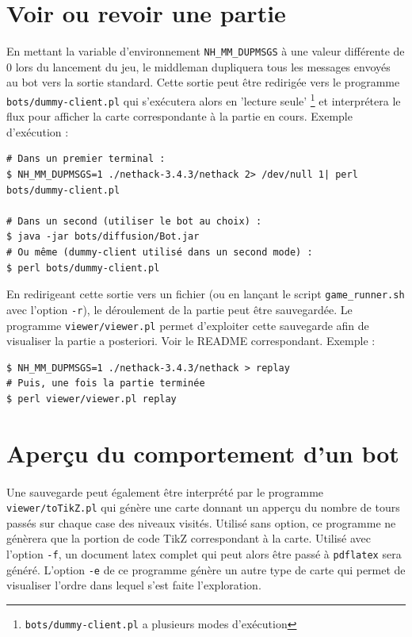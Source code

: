 \documentclass[10pt,a4paper]{report}
\begin{document}
\section{Voir ou revoir une partie}

En mettant la variable d'environnement \verb!NH_MM_DUPMSGS! à une valeur
différente de 0 lors du lancement du jeu, le middleman dupliquera tous les
messages envoyés au bot vers la sortie standard. Cette sortie peut être
redirigée vers le programme \verb!bots/dummy-client.pl! qui s'exécutera alors en
'lecture seule' \footnote{\verb!bots/dummy-client.pl! a plusieurs modes
d'exécution} et interprétera le flux pour afficher la carte correspondante à
la partie en cours. Exemple d'exécution :

\begin{verbatim}
# Dans un premier terminal :
$ NH_MM_DUPMSGS=1 ./nethack-3.4.3/nethack 2> /dev/null 1| perl bots/dummy-client.pl

# Dans un second (utiliser le bot au choix) :
$ java -jar bots/diffusion/Bot.jar
# Ou même (dummy-client utilisé dans un second mode) :
$ perl bots/dummy-client.pl
\end{verbatim}


En redirigeant cette sortie vers un fichier (ou en lançant le script
\verb!game_runner.sh! avec l'option \verb!-r!), le déroulement de la partie peut
être sauvegardée.  Le programme \verb!viewer/viewer.pl! permet d'exploiter
cette sauvegarde afin de visualiser la partie a posteriori. Voir le README
correspondant. Exemple :

\begin{verbatim}
$ NH_MM_DUPMSGS=1 ./nethack-3.4.3/nethack > replay
# Puis, une fois la partie terminée
$ perl viewer/viewer.pl replay
\end{verbatim}


\section{Aperçu du comportement d'un bot}

\paragraph{}
Une sauvegarde peut également être interprété par le
programme \verb!viewer/toTikZ.pl! qui génère une carte donnant un apperçu du
nombre de tours passés sur chaque case des niveaux visités. Utilisé sans
option, ce programme ne génèrera que la portion de code TikZ correspondant à
la carte. Utilisé avec l'option \verb!-f!, un document latex complet qui peut
alors être passé à \verb!pdflatex! sera généré.
L'option \verb!-e! de ce programme génère un autre type de carte
qui permet de visualiser l'ordre dans lequel s'est faite l'exploration.
\end{document}
